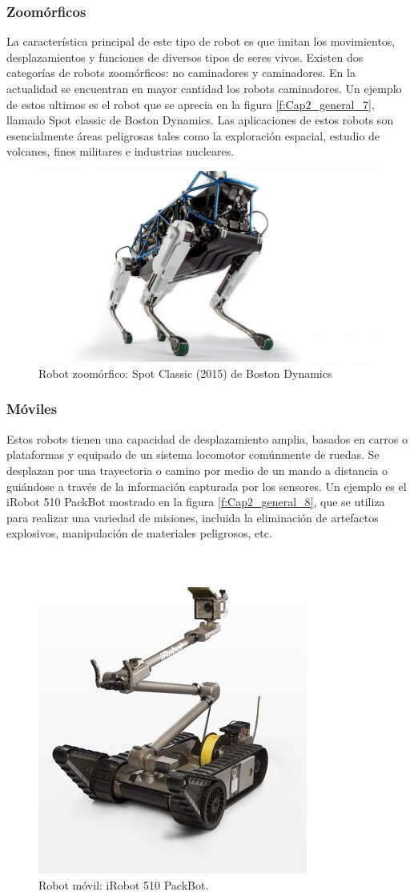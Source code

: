         \subsubsection{Zoomórficos}
        La característica principal de este tipo de robot es que imitan los movimientos, desplazamientos y funciones de diversos tipos de seres vivos. Existen dos categorías de robots zoomórficos: no caminadores y caminadores. En la actualidad se encuentran en mayor cantidad los robots caminadores. Un ejemplo de estos ultimos es el robot que se aprecia en la figura \eqref{f:Cap2_general_7}, llamado Spot classic de Boston Dynamics. Las aplicaciones de estos robots son esencialmente áreas peligrosas tales como la exploración espacial, estudio de volcanes, fines militares e industrias nucleares. 
        
        \begin{figure}[htb]
            \centering
            \includegraphics[width=0.48\linewidth]{Main/Chapter2/Images2/Robot-Zoomorico.jpg}
            \caption{Robot zoomórfico: Spot Classic (2015) de Boston Dynamics \cite{cap2_spotrobot}
 }
            \label{f:Cap2_general_7}
        \end{figure}
        
        \newpage
        
        \subsubsection{Móviles}
        Estos robots tienen una capacidad de desplazamiento amplia, basados en carros o plataformas y equipado de un sistema locomotor comúnmente de ruedas. Se desplazan por una trayectoria o camino por medio de un mando a distancia o guiándose a través de la información capturada por los sensores. Un ejemplo es el iRobot 510 PackBot mostrado en la figura \eqref{f:Cap2_general_8}, que se utiliza para realizar una variedad de misiones, incluida la eliminación de artefactos explosivos, manipulación de materiales peligrosos, etc.
        
        \begin{figure}[htb]
            \centering
            \includegraphics[width=0.27\linewidth]{Main/Chapter2/Images2/Robots-moviles.jpg}
            \caption{Robot móvil: 
            iRobot 510 PackBot.\cite{cap2_iRobot510}}
            \label{f:Cap2_general_8}
        \end{figure}
        
